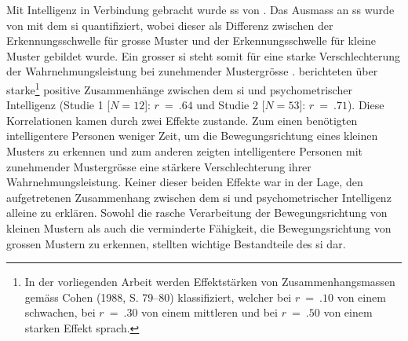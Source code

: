 \documentclass[11pt, twoside, a4paper]{book}		%
\begin{document}
Mit Intelligenz in Verbindung gebracht wurde \gls{ss} von \citet{Melnick2013}.
Das Ausmass an \gls{ss} wurde von\break\citeauthor{Melnick2013} mit dem \gls{si} quantifiziert, wobei dieser als Differenz zwischen der Erkennungsschwelle für grosse Muster und der Erkennungsschwelle für kleine Muster gebildet wurde.
Ein grosser \gls{si} steht somit für eine starke Verschlechterung der Wahrnehmungsleistung bei zunehmender Mustergrösse \citep[das heisst einer stark ausgeprägten \gls{ss};][]{Tadin2006}. 
\citeauthor{Melnick2013} berichteten über starke\footnote{In der vorliegenden Arbeit werden Effektstärken von Zusammenhangsmassen gemäss Cohen (1988, S. 79--80) klassifiziert, welcher bei $r~=~.10$ von einem schwachen, bei $r~=~.30$ von einem mittleren und bei $r~=~.50$ von einem starken Effekt sprach.} positive Zusammenhänge zwischen dem \gls{si} und psychometrischer Intelligenz (Studie 1 [$N=12$]: $r~=~.64$ und Studie 2 [$N=53$]: $r~=~.71$). Diese Korrelationen kamen durch zwei Effekte zustande. Zum einen benötigten intelligentere Personen weniger Zeit, um die Bewegungsrichtung eines kleinen Musters zu erkennen und zum anderen zeigten intelligentere Personen mit zunehmender Mustergrösse eine stärkere Verschlechterung ihrer Wahrnehmungsleistung. Keiner dieser beiden Effekte war in der Lage, den aufgetretenen Zusammenhang zwischen dem \gls{si} und psychometrischer Intelligenz alleine zu erklären. Sowohl die rasche Verarbeitung der Bewegungsrichtung von kleinen Mustern als auch die verminderte Fähigkeit, die Bewegungsrichtung von grossen Mustern zu erkennen, stellten wichtige Bestandteile des \gls{si} dar. 
\end{document}
